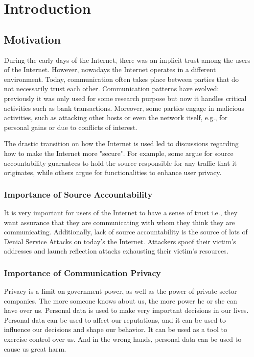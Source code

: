 
\chapter{Introduction} %

\label{intro} %

\section{Motivation}
During the early days of the Internet, there was an implicit trust among the users of the Internet. However, nowadays the Internet operates in a different environment. Today, communication often takes place between parties that do not necessarily trust each other. Communication patterns have evolved: previously it was only used for some research purpose but now it handles critical activities such as bank transactions. Moreover, some parties engage in malicious activities, such as attacking other hosts or even the network itself, e.g., for personal gains or due to conflicts of interest.

The drastic transition on how the Internet is used led to discussions regarding how to make the Internet more "secure". For example, some argue for source accountability guarantees to hold the source responsible for any traffic that it originates, while others argue for functionalities to enhance user privacy.

\subsection{Importance of Source Accountability}
It is very important for users of the Internet to have a sense of trust i.e., they want assurance that they are communicating with whom they think they are communicating. Additionally, lack of source accountability is the source of lots of Denial Service Attacks on today's the Internet. Attackers spoof their victim's addresses and launch reflection attacks exhausting their victim's resources.

\subsection{Importance of Communication Privacy}
Privacy is a limit on government power, as well as the power of private sector companies. The more someone knows about us, the more power he or she can have over us. Personal data is used to make very important decisions in our lives. Personal data can be used to affect our reputations, and it can be used to influence our decisions and shape our behavior. It can be used as a tool to exercise control over us. And in the wrong hands, personal data can be used to cause us great harm.

